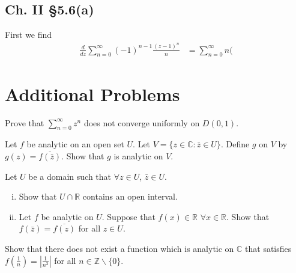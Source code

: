 \documentclass{article}
\newcounter{Problem}
\newenvironment{Problem}{\begin{Exercise}[name={Problem},
                                          counter={Problem}]}
                        {\end{Exercise}}
\begin{document}
\subsection*{Ch. II \S 5.6(a)}
First we find
\begin{align*}
   \frac{d}{dz} \sum_{n=0}^\infty (-1)^{n-1} \frac{(z-1)^n}{n}
&= \sum_{n=0}^\infty n (
\end{align*}

\section{Additional Problems}

\begin{Problem}
  Prove that $\sum_{n=0}^\infty z^n$ does not converge uniformly on
  $D(0, 1)$.
\end{Problem}

\begin{Problem}
  Let $f$ be analytic on an open set $U$. Let
  $V = \{ z \in \mathbb{C} : \bar{z} \in U \}$. Define $g$ on $V$ by
  $g(z) = \overline{f(\bar{z})}$. Show that $g$ is analytic on $V$.
\end{Problem}

\begin{Problem}
  Let $U$ be a domain such that $\forall z \in U$, $\bar{z} \in U$.
  \begin{enumerate}[(i)]
    \item{
      Show that $U \cap \mathbb{R}$ contains an open interval.
    }
    \item{
      Let $f$ be analytic on $U$. Suppose that $f(x) \in \mathbb{R}$
      $\forall x \in \mathbb{R}$. Show that $f(\bar{z}) = \overline{f(z)}$
      for all $z \in U$.
    }
  \end{enumerate}
\end{Problem}

\begin{Problem}
  Show that there does not exist a function which is analytic on
  $\mathbb{C}$ that satisfies
  $f\left(\frac{1}{n}\right) = \left|\frac{1}{n^3}\right|$ for all
  $n \in \mathbb{Z} \backslash \{ 0 \}$.
\end{Problem}
\end{document}
